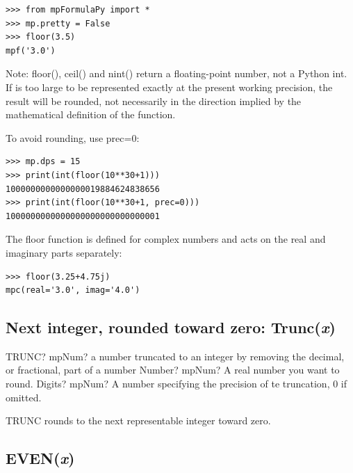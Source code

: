 \begin{lstlisting}
>>> from mpFormulaPy import *
>>> mp.pretty = False
>>> floor(3.5)
mpf('3.0')
\end{lstlisting}


Note: floor(), ceil() and nint() return a floating-point number, not a Python int. If is too large to be represented exactly at the present working precision, the result will be rounded, not necessarily in the direction implied by the mathematical definition of the function.

To avoid rounding, use prec=0:

\begin{lstlisting}
>>> mp.dps = 15
>>> print(int(floor(10**30+1)))
1000000000000000019884624838656
>>> print(int(floor(10**30+1, prec=0)))
1000000000000000000000000000001
\end{lstlisting}


The floor function is defined for complex numbers and acts on the real and imaginary parts separately:

\begin{lstlisting}
>>> floor(3.25+4.75j)
mpc(real='3.0', imag='4.0')
\end{lstlisting}



\subsection{Next integer, rounded toward zero: Trunc(\textit{x})}


\begin{mpFunctionsExtract}
	\mpWorksheetFunctionTwoNotImplemented
	{TRUNC? mpNum? a number truncated to an integer by removing the decimal, or fractional, part of a number}
	{Number? mpNum? A real number you want to round.}
	{Digits? mpNum? A number specifying the precision of te truncation, 0 if omitted.}
\end{mpFunctionsExtract}

\vspace{0.3cm}

TRUNC rounds to the next representable integer toward zero.




\subsection{EVEN(\textit{x})}


